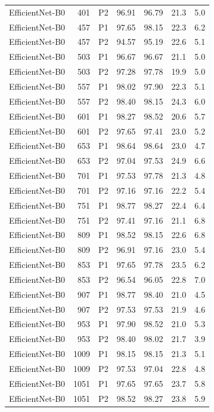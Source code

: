 {\begin{longtable}{lrlrrrr}
EfficientNet-B0 & 401 & P2 & 96.91 & 96.79 & 21.3 & 5.0 \\
EfficientNet-B0 & 457 & P1 & 97.65 & 98.15 & 22.3 & 6.2 \\
EfficientNet-B0 & 457 & P2 & 94.57 & 95.19 & 22.6 & 5.1 \\
EfficientNet-B0 & 503 & P1 & 96.67 & 96.67 & 21.1 & 5.0 \\
EfficientNet-B0 & 503 & P2 & 97.28 & 97.78 & 19.9 & 5.0 \\
EfficientNet-B0 & 557 & P1 & 98.02 & 97.90 & 22.3 & 5.1 \\
EfficientNet-B0 & 557 & P2 & 98.40 & 98.15 & 24.3 & 6.0 \\
EfficientNet-B0 & 601 & P1 & 98.27 & 98.52 & 20.6 & 5.7 \\
EfficientNet-B0 & 601 & P2 & 97.65 & 97.41 & 23.0 & 5.2 \\
EfficientNet-B0 & 653 & P1 & 98.64 & 98.64 & 23.0 & 4.7 \\
EfficientNet-B0 & 653 & P2 & 97.04 & 97.53 & 24.9 & 6.6 \\
EfficientNet-B0 & 701 & P1 & 97.53 & 97.78 & 21.3 & 4.8 \\
EfficientNet-B0 & 701 & P2 & 97.16 & 97.16 & 22.2 & 5.4 \\
EfficientNet-B0 & 751 & P1 & 98.77 & 98.27 & 22.4 & 6.4 \\
EfficientNet-B0 & 751 & P2 & 97.41 & 97.16 & 21.1 & 6.8 \\
EfficientNet-B0 & 809 & P1 & 98.52 & 98.15 & 22.6 & 6.8 \\
EfficientNet-B0 & 809 & P2 & 96.91 & 97.16 & 23.0 & 5.4 \\
EfficientNet-B0 & 853 & P1 & 97.65 & 97.78 & 23.5 & 6.2 \\
EfficientNet-B0 & 853 & P2 & 96.54 & 96.05 & 22.8 & 7.0 \\
EfficientNet-B0 & 907 & P1 & 98.77 & 98.40 & 21.0 & 4.5 \\
EfficientNet-B0 & 907 & P2 & 97.53 & 97.53 & 21.9 & 4.6 \\
EfficientNet-B0 & 953 & P1 & 97.90 & 98.52 & 21.0 & 5.3 \\
EfficientNet-B0 & 953 & P2 & 98.40 & 98.02 & 21.7 & 3.9 \\
EfficientNet-B0 & 1009 & P1 & 98.15 & 98.15 & 21.3 & 5.1 \\
EfficientNet-B0 & 1009 & P2 & 97.53 & 97.04 & 22.8 & 4.8 \\
EfficientNet-B0 & 1051 & P1 & 97.65 & 97.65 & 23.7 & 5.8 \\
EfficientNet-B0 & 1051 & P2 & 98.52 & 98.27 & 23.8 & 5.9 \\

\end{longtable}}
